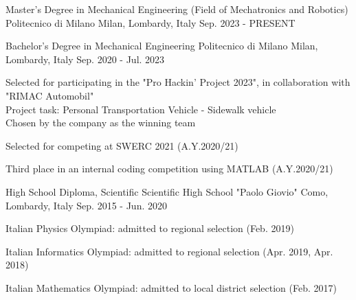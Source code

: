 

\begin{cventries}

  \cventry
  {Master's Degree in Mechanical Engineering (Field of Mechatronics and Robotics)} %
  {Politecnico di Milano} %
  {Milan, Lombardy, Italy} %
  {Sep. 2023 - PRESENT} %
  { }


  \cventry
  {Bachelor's Degree in Mechanical Engineering} %
  {Politecnico di Milano} %
  {Milan, Lombardy, Italy} %
  {Sep. 2020 - Jul. 2023} %
  {
    \begin{cvitems} %
      \item {Selected for participating in the "Pro Hackin' Project 2023", in collaboration with "RIMAC Automobil"\\
                  Project task: Personal Transportation Vehicle - Sidewalk vehicle\\
                  Chosen by the company as the winning team}
      \item {Selected for competing at SWERC 2021 (A.Y.2020/21)}
      \item {Third place in an internal coding competition using MATLAB (A.Y.2020/21)}
    \end{cvitems}
  }


  \cventry
  {High School Diploma, Scientific} %
  {Scientific High School "Paolo Giovio"} %
  {Como, Lombardy, Italy} %
  {Sep. 2015 - Jun. 2020} %
  {
    \begin{cvitems} %
      \item {Italian Physics Olympiad: admitted to regional selection (Feb. 2019)}
      \item {Italian Informatics Olympiad: admitted to regional selection (Apr. 2019, Apr. 2018)}
      \item {Italian Mathematics Olympiad: admitted to local district selection (Feb. 2017)}
    \end{cvitems}
  }

\end{cventries}
